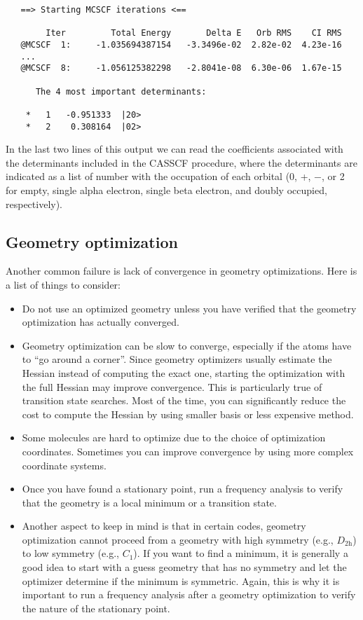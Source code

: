 \documentclass[../Main/chem532-notes.tex]{subfiles}
\begin{document}
\begin{verbatim}
   ==> Starting MCSCF iterations <==

        Iter         Total Energy       Delta E   Orb RMS    CI RMS
   @MCSCF  1:     -1.035694387154   -3.3496e-02  2.82e-02  4.23e-16
   ...
   @MCSCF  8:     -1.056125382298   -2.8041e-08  6.30e-06  1.67e-15
   
      The 4 most important determinants:

    *   1   -0.951333  |20>
    *   2    0.308164  |02>
\end{verbatim}
In the last two lines of this output we can read the coefficients associated with the determinants included in the CASSCF procedure, where the determinants are indicated as a list of number with the occupation of each orbital (0, +, $-$, or 2 for empty, single alpha electron, single beta electron, and doubly occupied, respectively).


\subsection{Geometry optimization}

Another common failure is lack of convergence in geometry optimizations. Here is a list of things to consider:
\begin{itemize}
\item Do not use an optimized geometry unless you have verified that the geometry optimization has actually converged.

\item Geometry optimization can be slow to converge,  especially if the atoms have to ``go around a corner''. Since geometry optimizers usually estimate the Hessian instead of computing the exact one, starting the optimization with the full Hessian may improve convergence. This is particularly true of transition state searches. Most of the time, you can significantly reduce the cost to compute the Hessian by using smaller basis or less expensive method.

\item Some molecules are hard to optimize due to the choice of optimization coordinates. Sometimes you can improve convergence by using more complex coordinate systems.

\item Once you have found a stationary point, run a frequency analysis to verify that the geometry is a local minimum or a transition state.

\item Another aspect to keep in mind is that in certain codes, geometry optimization cannot proceed from a geometry with high symmetry (e.g., $D_{2\mathrm{h}}$) to low symmetry (e.g., $C_1$). If you want to find a minimum, it is generally a good idea to start with a guess geometry that has no symmetry and let the optimizer determine if the minimum is symmetric.
Again, this is why it is important to run a frequency analysis after a geometry optimization to verify the nature of the stationary point.
\end{itemize}
\end{document}
